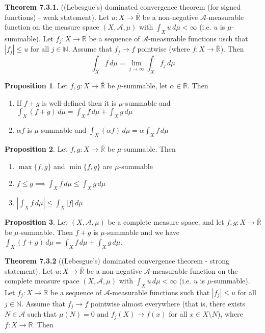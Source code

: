 \documentclass[a4paper,14pt]{extarticle}
\theoremstyle{definition}
\newtheorem{proposition}{Proposition}
\begin{document}
\vspace{12pt}

\noindent\textbf{Theorem 7.3.1.} ((Lebesgue's) dominated convergence theorem (for signed functions) - weak statement). Let $u:X\rightarrow\overline{\mathbb{R}}$ be a non-negative $\mathcal{A}$-measurable function on the measure space $(X,\mathcal{A},\mu)$ with $\int_X u \,d\mu<\infty$ (i.e. $u$ is $\mu$-summable). Let $f_j:X\rightarrow\mathbb{R}$ be a sequence of $\mathcal{A}$-measurable functions usch that $|f_j|\leq u$ for all $j\in\mathbb{N}$. Assume that $f_j\rightarrow f$ pointwise (where $f:X\rightarrow\overline{\mathbb{R}}$). Then 
\[\int_X f \,d\mu=\lim\limits_{j\to\infty}\int_X f_j \,d\mu\]
\begin{proposition}
  Let $f,g:X\rightarrow\overline{\mathbb{R}}$ be $\mu$-summable, let $\alpha\in\mathbb{R}$. Then 
  \begin{enumerate}
    \item If $f+g$ is well-defined then it is $\mu$-summable and $\int_X(f+g) \,d\mu=\int_X f \,d\mu + \int_X g \,d\mu$
    \item $\alpha f$ is $\mu$-summable and $\int_X (\alpha f) \,d\mu=\alpha\int_X f \,d\mu$
  \end{enumerate}
\end{proposition}
\begin{proposition} Let $f,g:X\rightarrow\overline{\mathbb{R}}$ be $\mu$-summable. Then
  \begin{enumerate}
    \item $\max\{f,g\}$ and $\min\{f,g\}$ are $\mu$-summable
    \item $f\leq g\implies \int_X f \,d\mu\leq\int_X g \,d\mu$
    \item $|\int_X f \,d\mu|\leq\int_X|f| \,d\mu$
  \end{enumerate}
\end{proposition}
\begin{proposition}
  Let $(X,\mathcal{A},\mu)$ be a complete measure space, and let $f,g:X\rightarrow\overline{\mathbb{R}}$ be $\mu$-summable. Then $f+g$ is $\mu$-summable and we have $\int_X (f+g) \,d\mu=\int_X f \,d\mu + \int_X g \,d\mu$.
\end{proposition}
\noindent\textbf{Theorem 7.3.2} ((Lebesgue's) dominated convergence theorem - strong statement). Let $u:X\rightarrow\overline{\mathbb{R}}$ be a non-negative $\mathcal{A}$-measurable function on the complete measure space $(X,\mathcal{A},\mu)$ with $\int_X u \,d\mu<\infty$ (i.e. $u$ is $\mu$-summable). Let $f_j:X\rightarrow\overline{\mathbb{R}}$ be a sequence of $\mathcal{A}$-measurable functions such that $|f_j|\leq u$ for all $j\in\mathbb{N}$. Assume that $f_j\rightarrow f$ pointwise almost everywhere (that is, there exists $N\in\mathcal{A}$ such that $\mu(N)=0$ and $f_j(X)\rightarrow f(x)$ for all $x\in X\setminus N$), where $f:X\rightarrow\overline{\mathbb{R}}$. Then 
\end{document}
